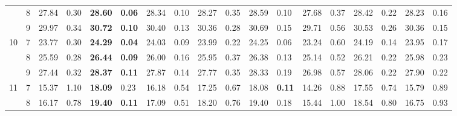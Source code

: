 \documentclass[conference]{IEEEtran}
\begin{document}
\begin{table*}[]
\begin{tabular}{|cc|ll|ll|ll|ll|ll|ll|ll|ll|}
		\multicolumn{1}{|c|}{} & 8 & \multicolumn{1}{l|}{27.84} & 0.30 & \multicolumn{1}{l|}{\textbf{28.60}} & \textbf{0.06} & \multicolumn{1}{l|}{28.34} & 0.10 & \multicolumn{1}{l|}{28.27} & 0.35 & \multicolumn{1}{l|}{28.59} & 0.10 & \multicolumn{1}{l|}{27.68} & 0.37 & \multicolumn{1}{l|}{28.42} & 0.22 & \multicolumn{1}{l|}{28.23} & 0.16 \\ \cline{2-18} 
		\multicolumn{1}{|c|}{} & 9 & \multicolumn{1}{l|}{29.97} & 0.34 & \multicolumn{1}{l|}{\textbf{30.72}} & \textbf{0.10} & \multicolumn{1}{l|}{30.40} & 0.13 & \multicolumn{1}{l|}{30.36} & 0.28 & \multicolumn{1}{l|}{30.69} & 0.15 & \multicolumn{1}{l|}{29.71} & 0.56 & \multicolumn{1}{l|}{30.53} & 0.26 & \multicolumn{1}{l|}{30.36} & 0.15 \\ \hline
		\multicolumn{1}{|c|}{\multirow{3}{*}{10}} & 7 & \multicolumn{1}{l|}{23.77} & 0.30 & \multicolumn{1}{l|}{\textbf{24.29}} & \textbf{0.04} & \multicolumn{1}{l|}{24.03} & 0.09 & \multicolumn{1}{l|}{23.99} & 0.22 & \multicolumn{1}{l|}{24.25} & 0.06 & \multicolumn{1}{l|}{23.24} & 0.60 & \multicolumn{1}{l|}{24.19} & 0.14 & \multicolumn{1}{l|}{23.95} & 0.17 \\ \cline{2-18} 
		\multicolumn{1}{|c|}{} & 8 & \multicolumn{1}{l|}{25.59} & 0.28 & \multicolumn{1}{l|}{\textbf{26.44}} & \textbf{0.09} & \multicolumn{1}{l|}{26.00} & 0.16 & \multicolumn{1}{l|}{25.95} & 0.37 & \multicolumn{1}{l|}{26.38} & 0.13 & \multicolumn{1}{l|}{25.14} & 0.52 & \multicolumn{1}{l|}{26.21} & 0.22 & \multicolumn{1}{l|}{25.98} & 0.23 \\ \cline{2-18} 
		\multicolumn{1}{|c|}{} & 9 & \multicolumn{1}{l|}{27.44} & 0.32 & \multicolumn{1}{l|}{\textbf{28.37}} & \textbf{0.11} & \multicolumn{1}{l|}{27.87} & 0.14 & \multicolumn{1}{l|}{27.77} & 0.35 & \multicolumn{1}{l|}{28.33} & 0.19 & \multicolumn{1}{l|}{26.98} & 0.57 & \multicolumn{1}{l|}{28.06} & 0.22 & \multicolumn{1}{l|}{27.90} & 0.22 \\ \hline
		\multicolumn{1}{|c|}{\multirow{3}{*}{11}} & 7 & \multicolumn{1}{l|}{15.37} & 1.10 & \multicolumn{1}{l|}{\textbf{18.09}} & 0.23 & \multicolumn{1}{l|}{16.18} & 0.54 & \multicolumn{1}{l|}{17.25} & 0.67 & \multicolumn{1}{l|}{18.08} & \textbf{0.11} & \multicolumn{1}{l|}{14.26} & 0.88 & \multicolumn{1}{l|}{17.55} & 0.74 & \multicolumn{1}{l|}{15.79} & 0.89 \\ \cline{2-18} 
		\multicolumn{1}{|c|}{} & 8 & \multicolumn{1}{l|}{16.17} & 0.78 & \multicolumn{1}{l|}{\textbf{19.40}} & \textbf{0.11} & \multicolumn{1}{l|}{17.09} & 0.51 & \multicolumn{1}{l|}{18.20} & 0.76 & \multicolumn{1}{l|}{19.40} & 0.18 & \multicolumn{1}{l|}{15.44} & 1.00 & \multicolumn{1}{l|}{18.54} & 0.80 & \multicolumn{1}{l|}{16.75} & 0.93 \\ \cline{2-18} 

\end{tabular}
\end{table*}
\end{document}

